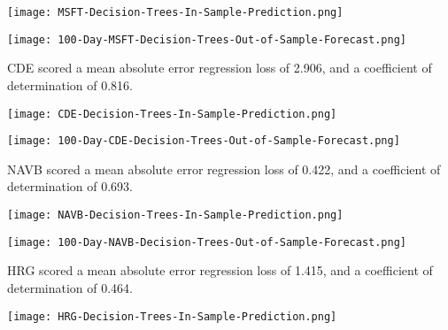\begin{center}
    \texttt{[image: MSFT-Decision-Trees-In-Sample-Prediction.png]}
    \label{fig:nonfloat}
\end{center}

\begin{center}  
    \texttt{[image: 100-Day-MSFT-Decision-Trees-Out-of-Sample-Forecast.png]}
    \label{fig:nonfloat}
\end{center}

CDE scored a mean absolute error regression loss of 2.906, and a coefficient of determination of 0.816.

\begin{center}
    \texttt{[image: CDE-Decision-Trees-In-Sample-Prediction.png]}
    \label{fig:nonfloat}
\end{center}

\begin{center}  
    \texttt{[image: 100-Day-CDE-Decision-Trees-Out-of-Sample-Forecast.png]}
    \label{fig:nonfloat}
\end{center}

NAVB scored a mean absolute error regression loss of 0.422, and a coefficient of determination of 0.693.

\begin{center}
    \texttt{[image: NAVB-Decision-Trees-In-Sample-Prediction.png]}
    \label{fig:nonfloat}
\end{center}

\begin{center}  
    \texttt{[image: 100-Day-NAVB-Decision-Trees-Out-of-Sample-Forecast.png]}
    \label{fig:nonfloat}
\end{center}

HRG scored a mean absolute error regression loss of 1.415, and a coefficient of determination of 0.464.

\begin{center}
    \texttt{[image: HRG-Decision-Trees-In-Sample-Prediction.png]}
    \label{fig:nonfloat}
\end{center}

